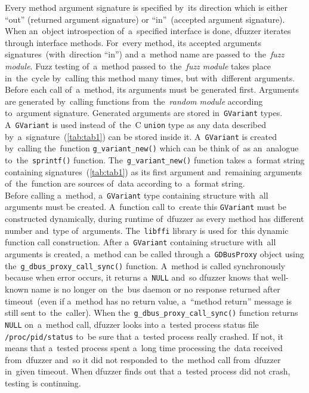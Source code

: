 Every method argument signature is specified by~its
direction which is either ``out'' (returned argument signature) or
``in''~(accepted argument signature). When an~object introspection of~a~specified
interface is done, dfuzzer iterates through interface methods. For~every method,
its accepted arguments signatures~(with~direction ``in'') and a~method name are
passed to~the~\emph{fuzz module}.
Fuzz testing of~a~method passed to~the~\emph{fuzz module} takes place in~the~cycle
by~calling this method many times, but with~different arguments. Before each
call of~a~method, its arguments must be generated first. Arguments are generated
by~calling functions from~the~\emph{random module} according to~argument signature.
Generated arguments are stored in~\texttt{GVariant} types. A~\texttt{GVariant}
is used instead of~the~C \texttt{union} type as any data described
by~a~signature~(\ref{tab:tab1}) can be stored inside it. A~\texttt{GVariant} is
created by~calling the~function \texttt{g\_variant\_new()} which can be think
of~as an~analogue to~the~\texttt{sprintf()} function. The~\texttt{g\_variant\_new()}
function takes a~format string containing signatures~(\ref{tab:tab1}) as its first
argument and~remaining arguments of~the~function are sources of~data according
to~a~format string.\\

Before calling a~method, a~\texttt{GVariant} type containing structure with~all
arguments must be created. A~function call to~create this \texttt{GVariant} must
be constructed dynamically, during runtime of~dfuzzer as every method has different
number and~type of~arguments. The~\texttt{libffi} library is used for~this dynamic
function call construction. After a~\texttt{GVariant} containing structure with~all
arguments is created, a~method can be called through a~\texttt{GDBusProxy} object
using the~\texttt{g\_dbus\_proxy\_call\_sync()} function. A~method is called
synchronously because when error occurs, it returns a~\texttt{NULL} and~so dfuzzer
knows that well-known name is no longer on~the~bus daemon or no response returned
after timeout~(even if a~method has no return value, a~``method return'' message
is still sent to~the~caller). When the~\texttt{g\_dbus\_proxy\_call\_sync()}
function returns \texttt{NULL} on~a~method call, dfuzzer looks into a~tested
process status file \texttt{/proc/pid/status} to~be sure that a~tested process
really crashed. If not, it means that a~tested process spent a~long time processing
the~data received from~dfuzzer and~so it did not responded to~the~method call
from~dfuzzer in~given timeout. When dfuzzer finds out that a~tested process did
not crash, testing is continuing.\\

